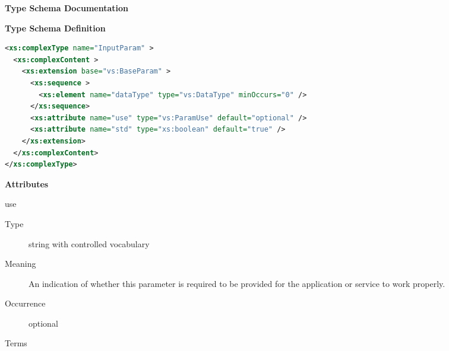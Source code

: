 \documentclass[11pt,a4paper]{ivoa}
\begin{document}
\begin{generated}
\begingroup
        \renewcommand*\descriptionlabel[1]{%
        \hbox to 5.5em{\emph{#1}\hfil}}\vspace{2ex}\noindent\textbf{ Type Schema Documentation}



\vspace{1ex}\noindent\textbf{ Type Schema Definition}

\begin{lstlisting}[language=XML,basicstyle=\footnotesize]
<xs:complexType name="InputParam" >
  <xs:complexContent >
    <xs:extension base="vs:BaseParam" >
      <xs:sequence >
        <xs:element name="dataType" type="vs:DataType" minOccurs="0" />
      </xs:sequence>
      <xs:attribute name="use" type="vs:ParamUse" default="optional" />
      <xs:attribute name="std" type="xs:boolean" default="true" />
    </xs:extension>
  </xs:complexContent>
</xs:complexType>
\end{lstlisting}

\vspace{0.5ex}\noindent\textbf{ Attributes}

\begingroup\small\begin{bigdescription}
\item[use]
\begin{description}
\item[Type] string with controlled vocabulary
\item[Meaning]
                     An indication of whether this parameter is
                     required to be provided for the application
                     or service to work properly.

\item[Occurrence] optional

\item[Terms]\hfil
{}
\end{description}
\end{bigdescription}
\end{generated}
\end{document}
